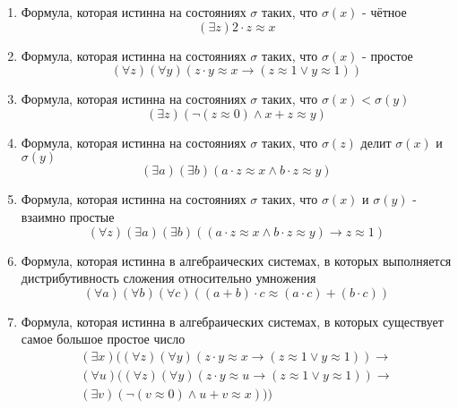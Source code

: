 \documentclass[12pt]{article}
\begin{document}
\begin{enumerate}
\item Формула, которая истинна на состояниях $\sigma$ таких, что $\sigma(x)$ - чётное
$$(\exists z)2\cdot z\approx x$$
\item Формула, которая истинна на состояниях $\sigma$ таких, что $\sigma(x)$ - простое
$$(\forall z)(\forall y)(z\cdot y\approx x\to(z\approx 1 \vee y\approx 1))$$
\item Формула, которая истинна на состояниях $\sigma$ таких, что $\sigma(x)<\sigma(y)$
$$(\exists z)(\neg(z\approx 0)\wedge x+z\approx y)$$
\item Формула, которая истинна на состояниях $\sigma$ таких, что $\sigma(z)$ делит $\sigma(x)$ и $\sigma(y)$
$$(\exists a)(\exists b)(a\cdot z\approx x \wedge b\cdot z\approx y)$$
\item Формула, которая истинна на состояниях $\sigma$ таких, что $\sigma(x)$ и $\sigma(y)$ - взаимно простые
$$(\forall z)(\exists a)(\exists b)((a\cdot z\approx x \wedge b\cdot z\approx y) \to z\approx 1)$$
\item Формула, которая истинна в алгебраических системах, в которых выполняется дистрибутивность сложения относительно умножения
$$(\forall a)(\forall b)(\forall c)((a+b)\cdot c\approx (a\cdot c)+(b\cdot c))$$
\item Формула, которая истинна в алгебраических системах, в которых существует самое большое простое число
\begin{multline*}
(\exists x)((\forall z)(\forall y)(z\cdot y\approx x\to(z\approx 1 \vee y\approx 1))\to\\ (\forall u)((\forall z)(\forall y)(z\cdot y\approx u\to(z\approx 1 \vee y\approx 1))\to\\ (\exists v)(\neg(v\approx 0)\wedge u+v\approx x)))
\end{multline*}
\end{enumerate}
\end{document}

